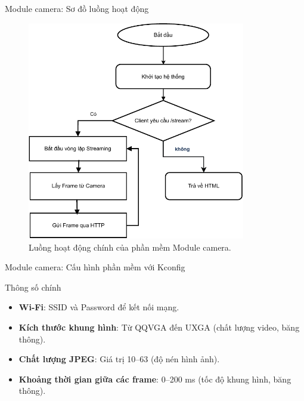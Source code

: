 \begin{frame}[fragile]{Module camera: Sơ đồ luồng hoạt động}
    \begin{figure}
        \centering
        \includegraphics[width=0.85\textwidth,height=0.7\textheight,keepaspectratio]{images/module2_flow_2.pdf}
        \caption{Luồng hoạt động chính của phần mềm Module camera.}
        \label{fig:sw_architecture_flow}
    \end{figure}
\end{frame}

\begin{frame}{Module camera: Cấu hình phần mềm với Kconfig}
    \begin{block}{Thông số chính}
        \begin{itemize}
            \item \textbf{Wi-Fi}: SSID và Password để kết nối mạng.
            \item \textbf{Kích thước khung hình}: Từ QQVGA đến UXGA (chất lượng video, băng thông).
            \item \textbf{Chất lượng JPEG}: Giá trị 10–63 (độ nén hình ảnh).
            \item \textbf{Khoảng thời gian giữa các frame}: 0–200 ms (tốc độ khung hình, băng thông).
        \end{itemize}
    \end{block}
\end{frame}

